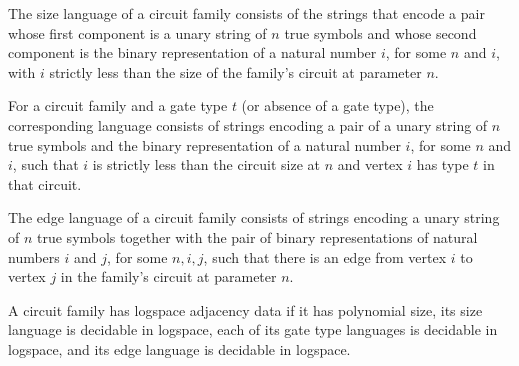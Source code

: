 \begin{definition}
\label{BoolCircuit.DAGCircuitFamily.sizeLang}
\leanok
{}
The size language of a circuit family consists of the strings that encode a pair whose
first component is a unary string of $n$ true symbols and whose second component is the
binary representation of a natural number $i$, for some $n$ and $i$, with $i$ strictly
less than the size of the family’s circuit at parameter $n$.
\end{definition}

\begin{definition}
\label{BoolCircuit.DAGCircuitFamily.typeLang}
\leanok
{}
For a circuit family and a gate type $t$ (or absence of a gate type), the corresponding
language consists of strings encoding a pair of a unary string of $n$ true symbols and
the binary representation of a natural number $i$, for some $n$ and $i$, such that $i$
is strictly less than the circuit size at $n$ and vertex $i$ has type $t$ in that
circuit.
\end{definition}

\begin{definition}
\label{BoolCircuit.DAGCircuitFamily.edgeLang}
\leanok
{}
The edge language of a circuit family consists of strings encoding a unary string of $n$
true symbols together with the pair of binary representations of natural numbers $i$ and
$j$, for some $n,i,j$, such that there is an edge from vertex $i$ to vertex $j$ in the
family’s circuit at parameter $n$.
\end{definition}

\begin{definition}
\label{BoolCircuit.DAGCircuitFamily.HasLogspaceAdjacency}
\leanok
{}
A circuit family has logspace adjacency data if it has polynomial size, its size
language is decidable in logspace, each of its gate type languages is decidable in
logspace, and its edge language is decidable in logspace.
\end{definition}

